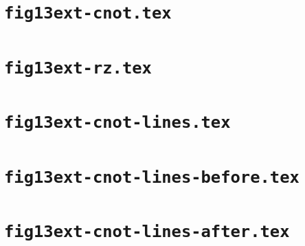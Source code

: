 \documentclass{article}
\begin{document}
\section*{\texttt{fig13ext-cnot.tex}}

\clearpage
\section*{\texttt{fig13ext-rz.tex}}

\clearpage
\section*{\texttt{fig13ext-cnot-lines.tex}}

\clearpage
\section*{\texttt{fig13ext-cnot-lines-before.tex}}

\clearpage
\section*{\texttt{fig13ext-cnot-lines-after.tex}}

\clearpage
\end{document}
